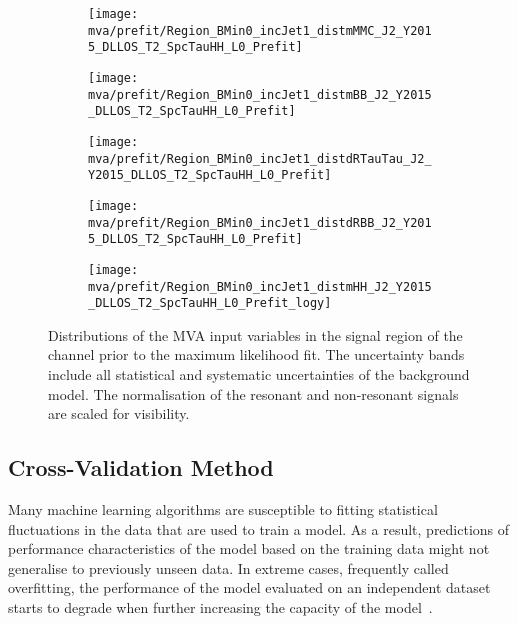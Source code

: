 \begin{figure}[htbp]
  \centering

  \begin{subfigure}[t]{.46\textwidth}
    \texttt{[image: mva/prefit/Region\_BMin0\_incJet1\_distmMMC\_J2\_Y2015\_DLLOS\_T2\_SpcTauHH\_L0\_Prefit]}
  \end{subfigure}\hfill %
  \begin{subfigure}[t]{.46\textwidth}
    \texttt{[image: mva/prefit/Region\_BMin0\_incJet1\_distmBB\_J2\_Y2015\_DLLOS\_T2\_SpcTauHH\_L0\_Prefit]}
  \end{subfigure}

  \begin{subfigure}[t]{.46\textwidth}
    \texttt{[image: mva/prefit/Region\_BMin0\_incJet1\_distdRTauTau\_J2\_Y2015\_DLLOS\_T2\_SpcTauHH\_L0\_Prefit]}
  \end{subfigure}\hfill %
  \begin{subfigure}[t]{.46\textwidth}
    \texttt{[image: mva/prefit/Region\_BMin0\_incJet1\_distdRBB\_J2\_Y2015\_DLLOS\_T2\_SpcTauHH\_L0\_Prefit]}
  \end{subfigure}

  \begin{subfigure}[t]{.46\textwidth}
    \texttt{[image: mva/prefit/Region\_BMin0\_incJet1\_distmHH\_J2\_Y2015\_DLLOS\_T2\_SpcTauHH\_L0\_Prefit\_logy]}
  \end{subfigure}

  \caption{Distributions of the MVA input variables in the signal
    region of the \hadhad channel prior to the maximum likelihood
    fit. The uncertainty bands include all statistical and systematic
    uncertainties of the background model. The normalisation of the
    resonant and non-resonant \HH signals are scaled for visibility.}%
  \label{fig:mva_inputs}
\end{figure}


\subsection{Cross-Validation Method}
\label{sec:mva_crossvalidation}

Many machine learning algorithms
are susceptible to fitting statistical fluctuations in the data that
are used to train a model. As a result, predictions of performance
characteristics of the model based on the training data might not
generalise to previously unseen data. In extreme cases, frequently
called overfitting, the performance of the model evaluated on an
independent dataset starts to degrade when further increasing the
capacity of the model~\cite{hastie09}.

